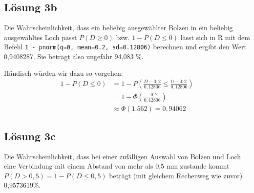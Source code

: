 \documentclass[main.tex]{subfiles}
\begin{document}
\subsection{Lösung 3b}
\lstset{language=R}

Die Wahrscheinlichkeit, dass ein beliebig ausgewählter Bolzen in ein beliebig ausgewähltes Loch passt $P(D \geq 0)$ bzw. $1-P(D \leq 0)$ lässt sich in R mit dem Befehl \lstinline|1 - pnorm(q=0, mean=0.2, sd=0.12806)| berechnen und ergibt den Wert 0,9408287. Sie beträgt also ungefähr 94,083 \%.

Händisch würden wir dazu so vorgehen: $$\begin{aligned}
    1 - P(D\leq 0) &= 1 - P\left(\frac{D- 0,2}{0,12806} \leq \frac{0-0,2}{0,12806}\right)\\[2mm]
    &= 1 - \Phi \left(\frac{-0,2}{0,12806}\right)\\[2mm]
    &\approx \Phi(1.562) = 0,94062
\end{aligned}$$

\subsection{Lösung 3c}
Die Wahrscheinlichkeit, dass bei einer zufälligen Auswahl von Bolzen und Loch eine Verbindung mit einem Abstand von mehr als 0,5 mm zustande kommt $P(D > 0,5) = 1 - P(D\leq 0,5)$ beträgt (mit gleichem Rechenweg wie zuvor) 0,9573619\%.
\end{document}
